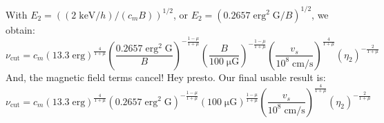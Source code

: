 \documentclass[iop, apj, numberedappendix, twocolappendix]{emulateapj}
\newcommand*{\mt}{\mathrm}
\newcommand*{\unit}[1]{\;\mt{#1}}  %
\newcommand*{\mE}{m_\mt{E}}
\newcommand*{\muG}{\unit{\mu G}}
\begin{document}
With $E_2 = \left( (2 \unit{keV}/h) / (c_m B) \right)^{1/2}$, or
$E_2 = \left( 0.2657 \unit{erg^2\;G} / B \right)^{1/2}$, we obtain:
\[
    \nu_{\mt{cut}} = c_m
        \left( 13.3 \unit{erg} \right)^{\frac{4}{1+\mu}}
        \left( \frac{0.2657 \unit{erg^2\;G}}{B} \right)^{-\frac{1-\mu}{1+\mu}}
        \left( \frac{B}{100\muG} \right)^{-\frac{1-\mu}{1+\mu}}
        \left( \frac{v_s}{10^8 \unit{cm/s}} \right)^{\frac{4}{1+\mu}}
        \left( \eta_2 \right)^{-\frac{2}{1+\mu}}
\]
And, the magnetic field terms cancel!  Hey presto.
Our final usable result is:
\[
    \nu_{\mt{cut}} = c_m
        \left( 13.3 \unit{erg} \right)^{\frac{4}{1+\mu}}
        \left( 0.2657 \unit{erg^2\;G} \right)^{-\frac{1-\mu}{1+\mu}}
        \left( 100 \muG \right)^{\frac{1-\mu}{1+\mu}}
        \left( \frac{v_s}{10^8 \unit{cm/s}} \right)^{\frac{4}{1+\mu}}
        \left( \eta_2 \right)^{-\frac{2}{1+\mu}}
\]

%
%
%
%    
%
%    
%
%    



\end{document}
